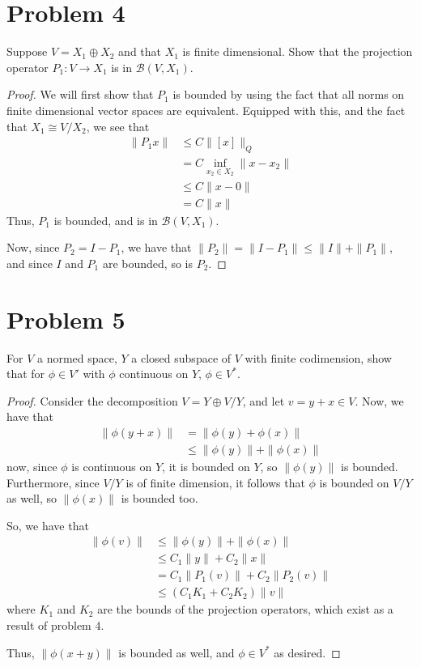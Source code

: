 \documentclass[fontsize=11pt]{scrartcl} %
\numberwithin{equation}{section} %
\numberwithin{figure}{section} %
\numberwithin{table}{section} %
\begin{document}
\newpage

\section*{Problem 4}
Suppose $V=X_1\oplus X_2$ and that $X_1$ is finite dimensional. Show that
the projection operator $P_1:V\to X_1$ is in $\mathscr{B}(V,X_1)$.
\\
\begin{proof}
We will first show that $P_1$ is bounded by using the fact that all norms on
    finite dimensional vector spaces are equivalent. Equipped with this, and the
    fact that $X_1\cong V/{X_2}$, we see that
    \[
        \begin{aligned}
            \|P_1x\| &\leq C\|[x]\|_{Q}\\
                    &= C\inf_{x_2\in X_2}\|x-x_2\|\\
                    &\leq C\|x-0\|\\
                    &=C\|x\|
        \end{aligned}
    \]
    Thus, $P_1$ is bounded, and is in $\mathscr{B}(V,X_1)$.

    Now, since $P_2 = I-P_1$, we have that $\|P_2\| = \|I-P_1\|\leq
    \|I\|+\|P_1\|$, and since $I$ and $P_1$ are bounded, so is $P_2$.
\end{proof}

\section*{Problem 5}
For $V$ a normed space, $Y$ a closed subspace of $V$ with finite codimension,
show that for $\phi\in V'$ with $\phi$ continuous on $Y$, $\phi\in V^*$.
\\
\begin{proof}
    Consider the decomposition $V=Y\oplus V/{Y}$, and let $v=y+x\in V$. Now,
    we have that
    \[
        \begin{aligned}
            \|\phi(y+x)\| &= \|\phi(y)+\phi(x)\|\\
                            &\leq \|\phi(y)\|+\|\phi(x)\|
        \end{aligned}
    \]
    now, since $\phi$ is continuous on $Y$, it is bounded on $Y$, so
    $\|\phi(y)\|$ is bounded. Furthermore, since $V/Y$ is of finite dimension,
    it follows that $\phi$ is bounded on $V/Y$ as well, so $\|\phi(x)\|$ is
    bounded too.

    So, we have that
    \[
        \begin{aligned}
            \|\phi(v)\| &\leq \|\phi(y)\| + \|\phi(x)\|\\
                        &\leq C_1\|y\| + C_2\|x\|\\
                        &= C_1\|P_1(v)\| + C_2\|P_2(v)\|\\
                        &\leq (C_1K_1 + C_2K_2)\|v\|
        \end{aligned}
    \]
    where $K_1$ and $K_2$ are the bounds of the projection operators, which
    exist as a result of problem 4.

    Thus, $\|\phi(x+y)\|$ is bounded as well, and $\phi\in V^*$ as desired.
\end{proof}
\end{document}

